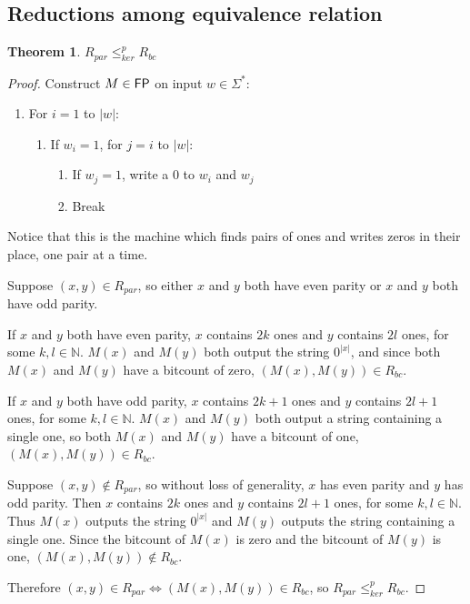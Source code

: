 \documentclass{article}
\newtheorem{theorem}{Theorem}[section]
\theoremstyle{definition}
\newcommand{\sigmastar}{\Sigma^{*}}
\newcommand{\kr}{\leq^{p}_{ker}} %
\begin{document}
\subsection{Reductions among equivalence relation}
\begin{theorem}$R_{par}\kr R_{bc}$\end{theorem}
\begin{proof}
  Construct $M\in {\ensuremath{\mathsf{FP}}}$ on input $w\in\sigmastar$:
  \begin{enumerate}
  \item For $i=1$ to $|w|$:
    \begin{enumerate}
    \item If $w_i = 1$, for $j=i$ to $|w|$:
      \begin{enumerate}
      \item If $w_j = 1$, write a $0$ to $w_i$ and $w_j$
      \item Break
      \end{enumerate}
    \end{enumerate}
  \end{enumerate}
  Notice that this is the machine which finds pairs of ones and writes zeros in
  their place, one pair at a time.

  Suppose $(x, y)\in R_{par}$, so either $x$ and $y$ both have even parity or
  $x$ and $y$ both have odd parity.
  
  If $x$ and $y$ both have even parity, $x$ contains $2k$ ones and $y$ contains
  $2l$ ones, for some $k,l\in\mathbb{N}$. $M(x)$ and $M(y)$ both output the
  string $0^{|x|}$, and since both $M(x)$ and $M(y)$ have a bitcount of zero,
  $(M(x), M(y))\in R_{bc}$.

  If $x$ and $y$ both have odd parity, $x$ contains $2k+1$ ones and $y$
  contains $2l+1$ ones, for some $k,l\in\mathbb{N}$. $M(x)$ and $M(y)$ both
  output a string containing a single one, so both $M(x)$ and $M(y)$ have a
  bitcount of one, $(M(x), M(y))\in R_{bc}$.

  Suppose $(x, y)\notin R_{par}$, so without loss of generality, $x$ has even
  parity and $y$ has odd parity. Then $x$ contains $2k$ ones and $y$ contains
  $2l+1$ ones, for some $k,l\in\mathbb{N}$. Thus $M(x)$ outputs the string
  $0^{|x|}$ and $M(y)$ outputs the string containing a single one. Since the
  bitcount of $M(x)$ is zero and the bitcount of $M(y)$ is one,
  $(M(x), M(y))\notin R_{bc}$.

  Therefore $(x, y)\in R_{par} \iff (M(x), M(y))\in R_{bc}$, so
  $R_{par} \kr R_{bc}$.
\end{proof}
\end{document}
